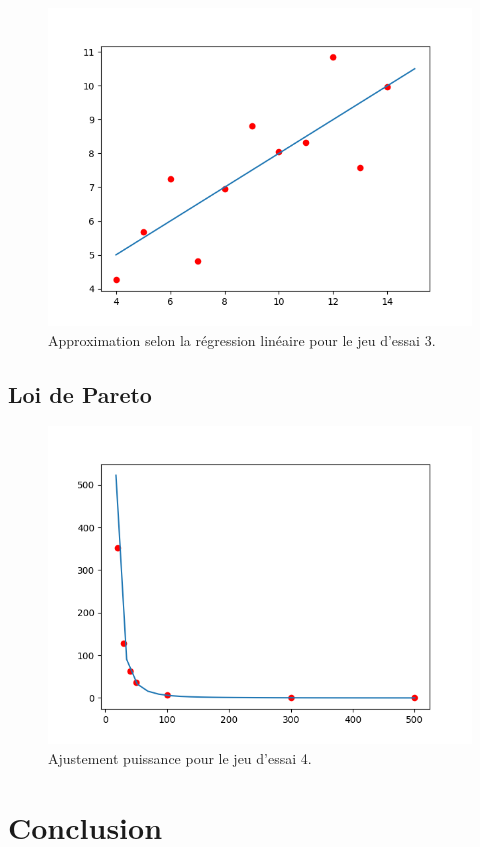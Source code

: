 \documentclass[12pt,french,titlepage]{article}
\begin{document}
		\begin{figure}[H]
		\includegraphics[width=\textwidth]{"33.png"}
		\caption{Approximation selon la régression linéaire pour le jeu d'essai 3.}
		\end{figure}
	
	\subsection{Loi de Pareto}
		\begin{figure}[H]
		\includegraphics[width=\textwidth]{"4.png"}
		\caption{Ajustement puissance pour le jeu d'essai 4.}
		\end{figure}
	
	\section{Conclusion}
	
	
	
\end{document}
